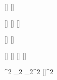 

\varDef{\angleTwo}{\beta}
\varDef{\angleOne}{\alpha}
\varDef{\angleFour}{\Pi}
\varDef{\angleThree}{\Gamma}

[\mathbb]
[\mathbb]

[\mathcal]
[\mathcal]
[\mathbb]

[\mathcal]
[\mathcal]

[\vectorFmt]
[\unitVecFmt]
[\firstDerivative]
[\secondDerivative]

^{2}
_{2}
_{2}^{2}
[\vectorFmt]^{2}


